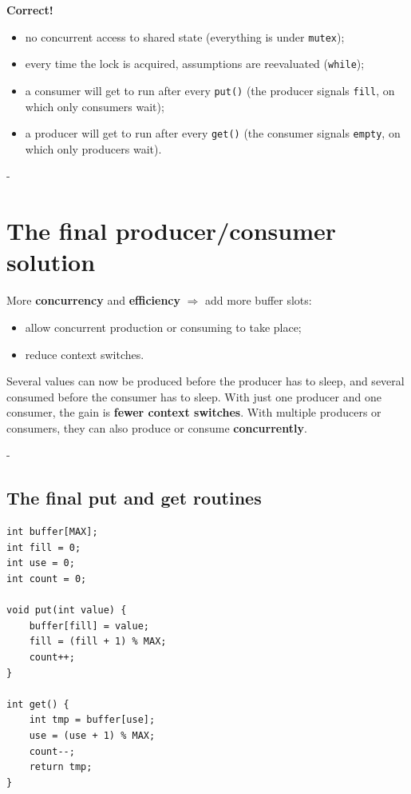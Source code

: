 \documentclass[11pt,a4paper]{article}
\makeatletter
\newcommand{\keepspace}[1]{\par\penalty-100\begingroup
  \setlength{\dimen@}{#1}\dimen@ii\pagegoal\advance\dimen@ii-\pagetotal
  \ifdim\dimen@>\dimen@ii\ifdim\dimen@ii>\z@\vfil\fi\break\fi\endgroup}
\makeatother
\begin{document}
\begin{solbox}
\textbf{Correct!}
\begin{itemize}
  \item no concurrent access to shared state (everything is under
        \texttt{mutex});
  \item every time the lock is acquired, assumptions are reevaluated
        (\texttt{while});
  \item a consumer will get to run after every \texttt{put()} (the producer
        signals \texttt{fill}, on which only consumers wait);
  \item a producer will get to run after every \texttt{get()} (the consumer
        signals \texttt{empty}, on which only producers wait).
\end{itemize}
\end{solbox}

\keepspace{10\baselineskip}
\section{The final producer/consumer solution}

More \textbf{concurrency} and \textbf{efficiency} \(\Rightarrow\) add more
buffer slots:
\begin{itemize}
  \item allow concurrent production or consuming to take place;
  \item reduce context switches.
\end{itemize}
Several values can now be produced before the producer has to sleep, and
several consumed before the consumer has to sleep. With just one producer
and one consumer, the gain is \textbf{fewer context switches}. With multiple
producers or consumers, they can also produce or consume
\textbf{concurrently}.

\keepspace{22\baselineskip}
\subsection{The final put and get routines}

\begin{lstlisting}
int buffer[MAX];
int fill = 0;
int use = 0;
int count = 0;

void put(int value) {
    buffer[fill] = value;
    fill = (fill + 1) % MAX;
    count++;
}

int get() {
    int tmp = buffer[use];
    use = (use + 1) % MAX;
    count--;
    return tmp;
}
\end{lstlisting}
\end{document}
